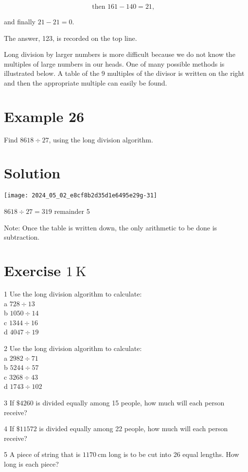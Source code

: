 \documentclass[10pt]{article}
\begin{document}
\[
\text { then } 161-140=21 \text {, } \quad
\]

and finally \(21-21=0\).

The answer, 123, is recorded on the top line.

Long division by larger numbers is more difficult because we do not know the multiples of large numbers in our heads. One of many possible methods is illustrated below. A table of the 9 multiples of the divisor is written on the right and then the appropriate multiple can easily be found.

\section*{Example 26}
Find \(8618 \div 27\), using the long division algorithm.

\section*{Solution}
\begin{center}
\texttt{[image: 2024\_05\_02\_e8cf8b2d35d1e6495e29g-31]}
\end{center}

\(8618 \div 27=319\) remainder 5

Note: Once the table is written down, the only arithmetic to be done is subtraction.

\section*{Exercise \(1 \mathrm{~K}\)}
1 Use the long division algorithm to calculate:\\
a \(728 \div 13\)\\
b \(1050 \div 14\)\\
c \(1344 \div 16\)\\
d \(4047 \div 19\)

2 Use the long division algorithm to calculate:\\
a \(2982 \div 71\)\\
b \(5244 \div 57\)\\
c \(3268 \div 43\)\\
d \(1743 \div 102\)

3 If \(\$ 4260\) is divided equally among 15 people, how much will each person receive?

4 If \(\$ 11572\) is divided equally among 22 people, how much will each person receive?

5 A piece of string that is \(1170 \mathrm{~cm}\) long is to be cut into 26 equal lengths. How long is each piece?
\end{document}
